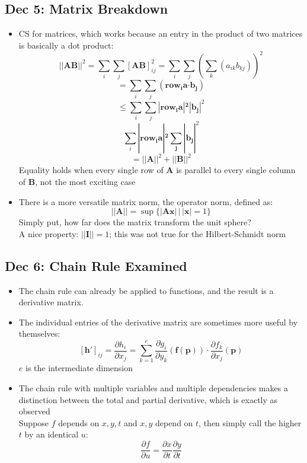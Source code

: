 \documentclass[10pt, oneside]{article}
\newcommand{\del}{\partial}
\let\leq\leqslant
\newcommand{\Cdot}{\boldsymbol{\cdot}}
\renewcommand{\vec}[1]{\mathbf{#1}}
\newcommand{\vecf}[1]{\boldsymbol{#1}}
\newcommand{\mat}[1]{\mathbf{#1}}
\begin{document}
\subsection{Dec 5: Matrix Breakdown}
\begin{itemize}
    \item CS for matrices, which works because an entry in the product of two matrices is basically a dot product:
        \[||\mat{AB}||^2 = \sum_i \sum_j [\mat{AB}]_{ij}^2 = \sum_i \sum_j \left(\sum_k(a_{ik} b_{kj})\right)^2\]
        \[= \sum_i \sum_j (\vec{\text{row}_i a \Cdot \vec{b_j}})\]
        \[\leq \sum_i \sum_j |\vec{\text{row}_i a|^2 |\vec{b_j}}|^2\]
        \[\sum_i |\vec{\text{row}_i a|^2 \sum_j |\vec{b_j}}|^2\]
        \[= ||\mat{A}||^2 + ||\mat{B}||^2\]
        Equality holds when every single row of $\mat{A}$ is parallel to every single column of $\mat{B}$, not the most exciting case
    \item There is a more versatile matrix norm, the operator norm, defined as:
        \[||\mat{A}|| = \sup\{|\mat{A}\vec{x}| \, | \, |\vec{x}| = 1\}\]
        Simply put, how far does the matrix transform the unit sphere?\\
        A nice property: $||\mat{I}|| = 1$; this was not true for the Hilbert-Schmidt norm
\end{itemize}

\subsection{Dec 6: Chain Rule Examined}
\begin{itemize}
    \item The chain rule can already be applied to functions, and the result is a derivative matrix.
    \item The individual entries of the derivative matrix are sometimes more useful by themselves:
        \[[\vecf{h'}]_{ij} = \frac{\del h_i}{\del x_j} = \sum_{k = 1}^e\frac{\del g_i}{\del y_k} (\vecf{f}(\vec{p})) \cdot \frac{\del f_k}{\del x_j} (\vec{p})\]
        $e$ is the intermediate dimension
    \item The chain rule with multiple variables and multiple dependencies makes a distinction between the total and partial derivative, which is exactly as observed\\
    Suppose $f$ depends on $x,y,t$ and $x,y$ depend on $t$, then simply call the higher $t$ by an identical $u$:
        \[\frac{\del f}{\del u} = \frac{\del x}{\del t} \frac{\del y}{\del t}\]
\end{itemize}
\end{document}
